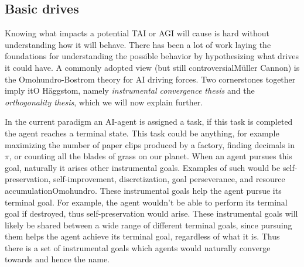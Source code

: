 \documentclass[12pt,A4]{report}
\newcommand{\autobaj}{}
\theoremstyle{definition}
\begin{document}
\subsection{Basic drives}
Knowing what impacts a potential TAI or AGI will cause is hard without understanding how it will behave. There has been a lot of work laying the foundations for understanding the possible behavior by hypothesizing what drives it could have. A commonly adopted view (but still controversial\autobaj{Müller Cannon}) is the Omohundro-Bostrom theory for AI driving forces. Two cornerstones together imply it\autobaj{O Häggstom}, namely \textit{instrumental convergence thesis} and the \textit{orthogonality thesis}, which we will now explain further.

In the current paradigm an AI-agent is assigned a task, if this task is completed the agent reaches a terminal state. This task could be anything, for example maximizing the number of paper clips produced by a factory, finding decimals in $\pi$, or counting all the blades of grass on our planet. When an agent pursues this goal, naturally it arises other instrumental goals. Examples of such would be self-preservation, self-improvement, discretization, goal perseverance, and resource accumulation\autobaj{Omohundro}. These instrumental goals help the agent pursue its terminal goal. For example, the agent wouldn't be able to perform its terminal goal if destroyed, thus self-preservation would arise. These instrumental goals will likely be shared between a wide range of different terminal goals, since pursuing them helps the agent achieve its terminal goal, regardless of what it is. Thus there is a set of instrumental goals which agents would naturally converge towards and hence the name. 

\end{document}
